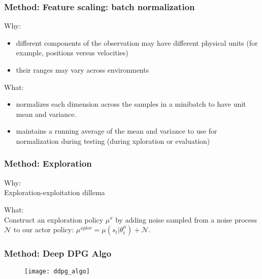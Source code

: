 \begin{frame}
\frametitle{Method: Feature scaling: batch normalization}
Why:
\begin{itemize}
\item different components of the observation may have different physical units (for example, positions versus velocities)
\item their ranges may vary across environments
\end{itemize}
\vspace{3mm}

What:
\begin{itemize}
\item normalizes each dimension across the samples in a minibatch to have unit mean and variance.
\item maintains a running average of the mean and variance to use for normalization during testing
(during xploration or evaluation)
\end{itemize}

\end{frame}

\begin{frame}
\frametitle{Method: Exploration}
Why:\\
Exploration-exploitation dillema
\vspace{5mm}

What:\\
Construct an exploration policy $\mu^x$ by adding noise sampled from
a noise process $\mathcal{N}$ to our actor policy:
$\mu^{xplor} = \mu(s_t | \theta^{\mu}_t) + \mathcal{N}$.

\end{frame}

\begin{frame}
\frametitle{Method: Deep DPG Algo}
\begin{figure}
    \centering
    \texttt{[image: ddpg\_algo]}
\end{figure}
\end{frame}
